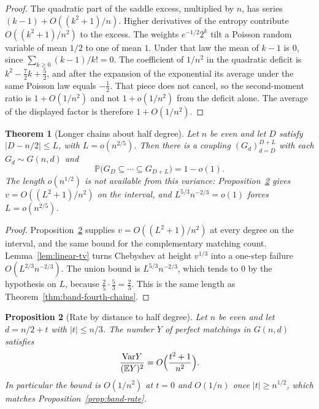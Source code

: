 \documentclass[11pt]{article}
\newtheorem{theorem}{Theorem}
\newtheorem{proposition}[theorem]{Proposition}
\newcommand{\EE}{\mathbb{E}}
\newcommand{\PP}{\mathbb{P}}
\newcommand{\Var}{\mathrm{Var}}
\begin{document}
\begin{proof}
The quadratic part of the saddle excess, multiplied by \(n\), has series \((k-1)+O((k^2+1)/n)\).
Higher derivatives of the entropy contribute \(O((k^2+1)/n^2)\) to the excess.
The weights \(e^{-1/2}2^{k}\) tilt a Poisson random variable of mean \(1/2\) to one of mean \(1\).
Under that law the mean of \(k-1\) is \(0\), since \(\sum_{k\ge 0}(k-1)/k!=0\).
The coefficient of \(1/n^2\) in the quadratic deficit is \(k^2-\tfrac72 k+\tfrac52\), and after the expansion of the exponential its average under the same Poisson law equals \(-\tfrac12\).
That piece does not cancel, so the second-moment ratio is \(1+O(1/n^2)\) and not \(1+o(1/n^2)\) from the deficit alone.
The average of the displayed factor is therefore \(1+O(1/n^2)\).
\end{proof}

\begin{theorem}[Longer chains about half degree]
\label{thm:half-chains}
Let \(n\) be even and let \(D\) satisfy \(|D-n/2|\le L\), with
\(L=o(n^{2/5})\).
Then there is a coupling \((G_d)_{d=D}^{D+L}\) with each \(G_d\sim G(n,d)\) and
\[
\PP\bigl(G_D\subseteq\cdots\subseteq G_{D+L}\bigr)=1-o(1).
\]
The length \(o(n^{1/2})\) is not available from this variance: Proposition~\ref{prop:distance-rate} gives \(v=O((L^2+1)/n^2)\) on the interval, and \(L^{5/3}n^{-2/3}=o(1)\) forces \(L=o(n^{2/5})\).
\end{theorem}

\begin{proof}
Proposition~\ref{prop:distance-rate} supplies \(v=O((L^2+1)/n^2)\) at every degree on the interval, and the same bound for the complementary matching count.
Lemma~\ref{lem:linear-tv} turns Chebyshev at height \(v^{1/3}\) into a one-step failure \(O(L^{2/3}n^{-2/3})\).
The union bound is \(L^{5/3}n^{-2/3}\), which tends to \(0\) by the hypothesis on \(L\), because \(\tfrac25\cdot\tfrac53=\tfrac23\).
This is the same length as Theorem~\ref{thm:band-fourth-chains}.
\end{proof}

\begin{proposition}[Rate by distance to half degree]
\label{prop:distance-rate}
Let \(n\) be even and let \(d=n/2+t\) with \(|t|\le n/3\).
The number \(Y\) of perfect matchings in \(G(n,d)\) satisfies
\[
\frac{\Var Y}{(\EE Y)^2}=O\Bigl(\frac{t^2+1}{n^2}\Bigr).
\]
In particular the bound is \(O(1/n^2)\) at \(t=0\) and \(O(1/n)\) once \(|t|\ge n^{1/2}\), which matches Proposition~\ref{prop:band-rate}.
\end{proposition}
\end{document}
